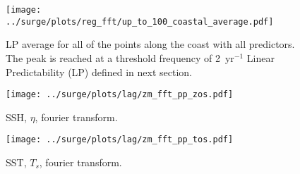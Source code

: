 
\begin{figure*}
\centering
        \texttt{[image: ../surge/plots/reg\_fft/up\_to\_100\_coastal\_average.pdf]}
            \caption{LP average for all of the points along the coast with all predictors.
                    The peak is reached at a threshold frequency of 2~yr$^{-1}$
                    Linear Predictability (LP) defined in next section.}
            \label{fig:lpredthresh}

            \texttt{[image: ../surge/plots/lag/zm\_fft\_pp\_zos.pdf]}
            \caption{SSH, $\eta$, fourier transform.}
            \label{fig:zm_fft_zos}

            \texttt{[image: ../surge/plots/lag/zm\_fft\_pp\_tos.pdf]}
            \caption{SST, $T_s$, fourier transform.}
            \label{fig:zm_fft_tos}

\end{figure*}
